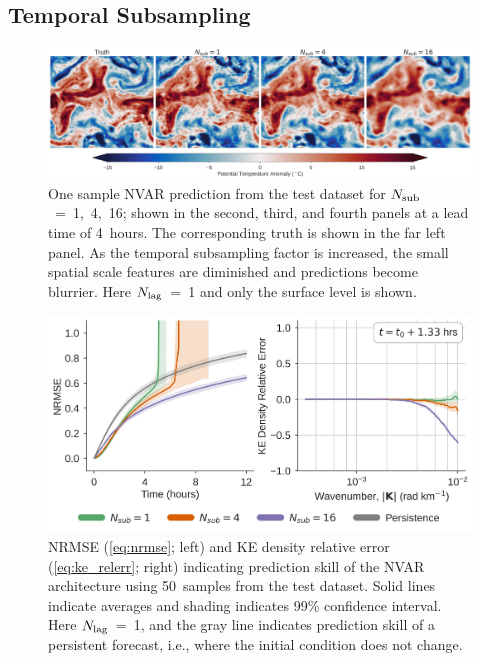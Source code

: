 \documentclass[draft]{agujournal2019}
\begin{document}
\subsection{Temporal Subsampling}
\label{subsec:nvar-subsampling}


\begin{figure}
    \centering
    \includegraphics[width=\textwidth]{figures/nvar_4hr_snap.jpg}
    \caption{One sample NVAR prediction from the test dataset for
        $N_\text{sub}$~=~1,~4,~16;
        shown in the second, third, and fourth panels at a lead time of 4~hours.
        The corresponding truth is shown in the far left panel.
        As the temporal subsampling factor is increased,
        the small spatial scale features are diminished and predictions become
        blurrier.
        Here $N_\text{lag}$~=~1 and only the surface level is shown.
    }
    \label{fig:nvar_qualitative}
\end{figure}

\begin{figure}
    \centering
    \includegraphics[width=.8\textwidth]{figures/nvar-nrmse-and-kere.jpg}
    \caption{NRMSE (\cref{eq:nrmse}; left) and KE density
        relative error (\cref{eq:ke_relerr}; right)
        indicating prediction skill of the NVAR
        architecture using 50~samples from the test dataset.
        Solid lines indicate averages and shading indicates 99\% confidence
        interval.
        Here $N_\text{lag}$~=~1, and the gray line indicates prediction skill of a
        persistent forecast, i.e., where the initial condition does not change.
    }
    \label{fig:nvar_nrmse}
\end{figure}
\end{document}
